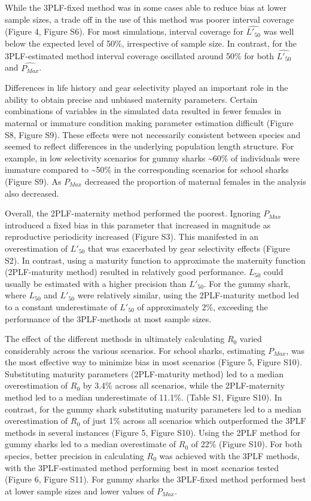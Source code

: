 \documentclass[
]{article}
\begin{document}
While the 3PLF-fixed method was in some cases able to reduce bias at lower sample sizes, a trade off in the use of this method was poorer interval coverage (Figure 4, Figure S6). For most simulations, interval coverage for \(\hat{L'_{50}}\) was well below the expected level of 50\%, irrespective of sample size. In contrast, for the 3PLF-estimated method interval coverage oscillated around 50\% for both \(\hat{L'_{50}}\) and \(\hat{P_{Max}}\).

Differences in life history and gear selectivity played an important role in the ability to obtain precise and unbiased maternity parameters. Certain combinations of variables in the simulated data resulted in fewer females in maternal or immature condition making parameter estimation difficult (Figure S8, Figure S9). These effects were not necessarily consistent between species and seemed to reflect differences in the underlying population length structure. For example, in low selectivity scenarios for gummy sharks \textasciitilde60\% of individuals were immature compared to \textasciitilde50\% in the corresponding scenarios for school sharks (Figure S9). As \(P_{Max}\) decreased the proportion of maternal females in the analysis also decreased.

Overall, the 2PLF-maternity method performed the poorest. Ignoring \(P_{Max}\) introduced a fixed bias in this parameter that increased in magnitude as reproductive periodicity increased (Figure S3). This manifested in an overestimation of \(L'_{50}\) that was exacerbated by gear selectivity effects (Figure S2). In contrast, using a maturity function to approximate the maternity function (2PLF-maturity method) resulted in relatively good performance. \(L_{50}\) could usually be estimated with a higher precision than \(L'_{50}\). For the gummy shark, where \(L_{50}\) and \(L'_{50}\) were relatively similar, using the 2PLF-maturity method led to a constant underestimate of \(L'_{50}\) of approximately 2\%, exceeding the performance of the 3PLF-methods at most sample sizes.

The effect of the different methods in ultimately calculating \(R_0\) varied considerably across the various scenarios. For school sharks, estimating \(P_{Max}\), was the most effective way to minimize bias in most scenarios (Figure 5, Figure S10). Substituting maturity parameters (2PLF-maturity method) led to a median overestimation of \(R_0\) by 3.4\% across all scenarios, while the 2PLF-maternity method led to a median underestimate of 11.1\%. (Table S1, Figure S10). In contrast, for the gummy shark substituting maturity parameters led to a median overestimation of \(R_0\) of just 1\% across all scenarios which outperformed the 3PLF methods in several instances (Figure 5, Figure S10). Using the 2PLF method for gummy sharks led to a median overestimate of \(R_0\) of 22\% (Figure S10). For both species, better precision in calculating \(R_0\) was achieved with the 3PLF methods, with the 3PLF-estimated method performing best in most scenarios tested (Figure 6, Figure S11). For gummy sharks the 3PLF-fixed method performed best at lower sample sizes and lower values of \(P_{Max}\).
\end{document}
